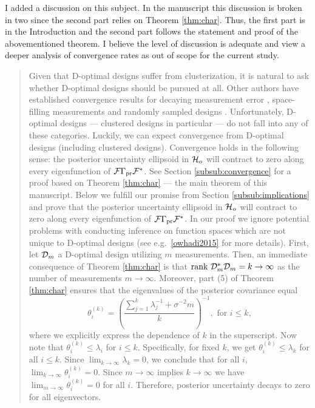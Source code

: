 \AR I added a discussion on this subject. In the manuscript this
discussion is broken in two since the second part relies on Theorem
\ref{thm:char}. Thus, the first part is in the Introduction and the
second part follows the statement and proof of the abovementioned
theorem. I believe the level of discussion is adequate and view a
deeper analysis of convergence rates as out of scope for the current
study.
\begin{quote}%
  Given that D-optimal designs suffer from clusterization, it is
  natural to ask whether D-optimal designs should be pursued at
  all. Other authors have established convergence results for decaying
  measurement error \cite{knapik2011}, space-filling measurements
  \cite{teckentrup2020} and randomly sampled designs
  \cite{nickl2023}. Unfortunately, D-optimal designs --- clustered
  designs in particular --- do not fall into any of these categories.
  \newline
  Luckily, we can expect convergence from D-optimal designs (including
  clustered designs). Convergence holds in the following sense: the
  posterior uncertainty ellipsoid in $\mathcal{H}_o$ will contract to zero
  along every eigenfunction of $\mathcal{F} \Gamma_{\textup{pr}} \mathcal{F}^*$. See Section
  \ref{subsub:convergence} for a proof based on Theorem \ref{thm:char}
  --- the main theorem of this manuscript.
  \newline
  Below we fulfill our promise from Section \ref{subsub:implications}
  and prove that the posterior uncertainty ellipsoid in $\mathcal{H}_o$ will
  contract to zero along every eigenfunction of $\mathcal{F} \Gamma_{\textup{pr}}
  \mathcal{F}^*$. In our proof we ignore potential problems with conducting
  inference on function spaces which are not unique to D-optimal
  designs (see e.g.~\ref{owhadi2015} for more details).
  \newline
  First, let $\mathcal{D}_m$ a D-optimal design utilizing $m$
  measurements. Then, an immediate consequence of Theorem
  \ref{thm:char} is that $\textup{rank}\  \mathcal{D}_m^*\mathcal{D}_m = k \to \infty$ as the
  number of measurements $m \to \infty$. Moreover, part (5) of Theorem
  \ref{thm:char} ensures that the eigenvalues of the posterior
  covariance equal
  \begin{equation*}
    \theta^{(k)}_i = \left ( \frac{\sum_{j=1}^k \lambda_j^{-1} +
      \sigma^{-2}m}{k} \right )^{-1}, \text{ for $i\leq k$},
  \end{equation*}
  where we explicitly express the dependence of $k$ in the
  superscript. Now note that $\theta^{(k)}_i \leq \lambda_i$ for
  $i\leq k$. Specifically, for fixed $k$, we get $\theta^{(k)}_i \leq
  \lambda_k$ for all $i\leq k$. Since $\lim_{k\to \infty} \lambda_k=
  0$, we conclude that for all $i$, $\lim_{k\to\infty} \theta^{(k)}_i
  = 0$. Since $m\to \infty$ implies $k\to \infty$ we have
  $\lim_{m\to\infty} \theta^{(k)}_i = 0$ for all $i$. Therefore,
  posterior uncertainty decays to zero for all eigenvectors.
\end{quote}




